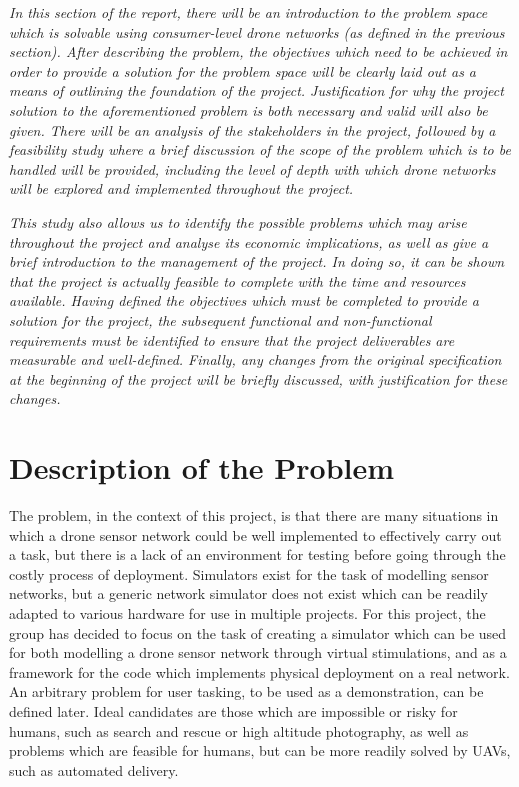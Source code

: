 \emph{In this section of the report, there will be an introduction to the problem space which is solvable using consumer-level drone networks (as defined in the previous section). After describing the problem, the objectives which need to be achieved in order to provide a solution for the problem space will be clearly laid out as a means of outlining the foundation of the project. Justification for why the project solution to the aforementioned problem is both necessary and valid will also be given. There will be an analysis of the stakeholders in the project, followed by a feasibility study where a brief discussion of the scope of the problem which is to be handled will be provided, including the level of depth with which drone networks will be explored and implemented throughout the project.}

\emph{This study also allows us to identify the possible problems which may arise throughout the project and analyse its economic implications, as well as give a brief introduction to the management of the project. In doing so, it can be shown that the project is actually feasible to complete with the time and resources available. Having defined the objectives which must be completed to provide a solution for the project, the subsequent functional and non-functional requirements must be identified to ensure that the project deliverables are measurable and well-defined. Finally, any changes from the original specification at the beginning of the project will be briefly discussed, with justification for these changes.}

\section{Description of the Problem}
The problem, in the context of this project, is that there are many situations in which a drone sensor network could be well implemented to effectively carry out a task, but there is a lack of an environment for testing before going through the costly process of deployment. Simulators exist for the task of modelling sensor networks, but a generic network simulator does not exist which can be readily adapted to various hardware for use in multiple projects. For this project, the group has decided to focus on the task of creating a simulator which can be used for both modelling a drone sensor network through virtual stimulations, and as a framework for the code which implements physical deployment on a real network. An arbitrary problem for user tasking, to be used as a demonstration, can be defined later. Ideal candidates are those which are impossible or risky for humans, such as search and rescue or high altitude photography, as well as problems which are feasible for humans, but can be more readily solved by UAVs, such as automated delivery. 


